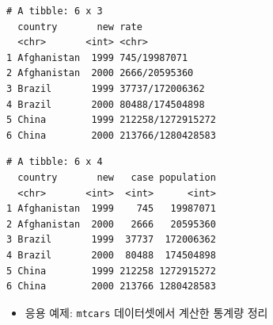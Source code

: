 \documentclass[
  11pt,
]{krantz}
\newenvironment{Shaded}{\begin{snugshade}}{\end{snugshade}}
\newcommand{\CommentTok}[1]{\textcolor[rgb]{0.37,0.37,0.37}{\textit{#1}}}
\newcommand{\DataTypeTok}[1]{\textcolor[rgb]{0.27,0.27,0.27}{#1}}
\newcommand{\KeywordTok}[1]{\textcolor[rgb]{0.27,0.27,0.27}{\textbf{#1}}}
\newcommand{\NormalTok}[1]{#1}
\newcommand{\OperatorTok}[1]{\textcolor[rgb]{0.43,0.43,0.43}{\textbf{#1}}}
\newcommand{\OtherTok}[1]{\textcolor[rgb]{0.37,0.37,0.37}{#1}}
\newcommand{\StringTok}[1]{\textcolor[rgb]{0.5,0.5,0.5}{#1}}
\providecommand{\tightlist}{%
  \setlength{\itemsep}{0pt}\setlength{\parskip}{0pt}}
\begin{document}
\begin{Shaded}
\end{Shaded}

\begin{verbatim}
# A tibble: 6 x 3
  country       new rate             
  <chr>       <int> <chr>            
1 Afghanistan  1999 745/19987071     
2 Afghanistan  2000 2666/20595360    
3 Brazil       1999 37737/172006362  
4 Brazil       2000 80488/174504898  
5 China        1999 212258/1272915272
6 China        2000 213766/1280428583
\end{verbatim}

\begin{Shaded}
\end{Shaded}

\begin{verbatim}
# A tibble: 6 x 4
  country       new   case population
  <chr>       <int>  <int>      <int>
1 Afghanistan  1999    745   19987071
2 Afghanistan  2000   2666   20595360
3 Brazil       1999  37737  172006362
4 Brazil       2000  80488  174504898
5 China        1999 212258 1272915272
6 China        2000 213766 1280428583
\end{verbatim}

\normalsize

\begin{itemize}
\tightlist
\item
  응용 예제: \texttt{mtcars} 데이터셋에서 계산한 통계량 정리
\end{itemize}
\end{document}

